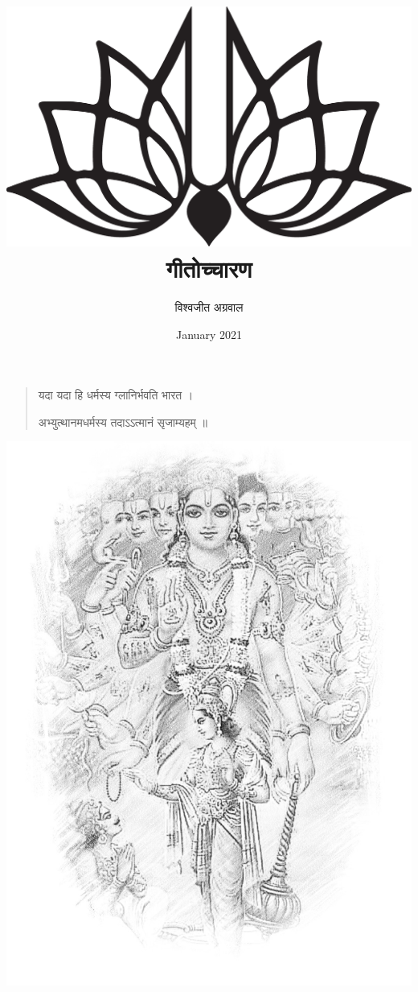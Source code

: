 \title{
	\includegraphics[scale=0.2,keepaspectratio]{eps5black}\\
	\sanskrit गीतोच्चारण}
\author{\sanskrit विश्वजीत अग्रवाल}
\date{January 2021	}
\maketitle
\begin{quotation}
	\begin{center}\sanskrit
	यदा यदा हि धर्मस्य ग्लानिर्भवति भारत  । 
	
	अभ्युत्थानमधर्मस्य तदाऽऽत्मानं सृजाम्यहम्  ॥ 
\end{center}
\end{quotation}
\begin{center}
	\includegraphics[scale=0.35,keepaspectratio]{CoverImage.jpg}
\end{center}
